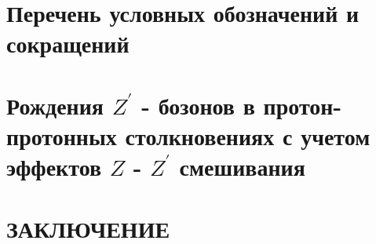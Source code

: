 \documentclass[12pt,a4paper]{styles/report}
\begin{document}
	
\renewcommand\contentsname{СОДЕРЖАНИЕ}
\renewcommand{\bibname}{БИБЛИОГРАФИЧЕСКИЙ СПИСОК}
\renewcommand\chaptername{ГЛАВА}
\renewcommand\figurename{Рисунок}
\renewcommand\tablename{Таблица}



\newpage
\pagestyle{plain}  \setcounter{page}{2}
\large \tableofcontents

\newpage
\chapter*{Перечень условных обозначений и сокращений}






\chapter{Рождения $Z^\prime$ - бозонов в протон-протонных столкновениях с учетом эффектов $Z$ - $Z^\prime$ смешивания}




\newpage
\chapter*{ЗАКЛЮЧЕНИЕ}


\newpage
\begin{thebibliography}{9999.}



\end{thebibliography}


\end{document}
